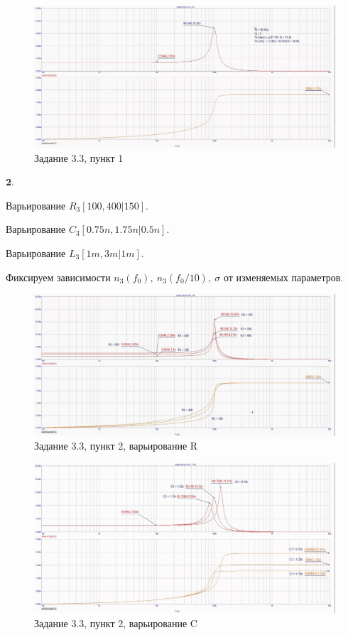 \documentclass[a4paper, 14pt]{extarticle}%
\begin{document}
\begin{figure}[h!]
			\centering
			\includegraphics[width=1.1\linewidth]{3/3_3_2.jpg}
			\caption{Задание 3.3, пункт 1}
			\label{A}
\end{figure}



$\textbf{2.} $

Варьирование $R_3[100, 400 | 150]$.

Варьирование $C_3[0.75n, 1.75n | 0.5n]$.

Варьирование $L_3[1m, 3m | 1m]$.

Фиксируем зависимости $n_3(f_0), \: n_3(f_0/10), \: \sigma$ от изменяемых параметров.


\begin{figure}[h!]
			\centering
			\includegraphics[width=1.1\linewidth]{3/3_3_5.jpg}
			\caption{Задание 3.3, пункт 2, варьирование R}
			\label{A}
\end{figure}



\begin{figure}[h!]
			\centering
			\includegraphics[width=1.1\linewidth]{3/3_3_3.jpg}
			\caption{Задание 3.3, пункт 2, варьирование C}
			\label{A}
\end{figure}
\end{document}
